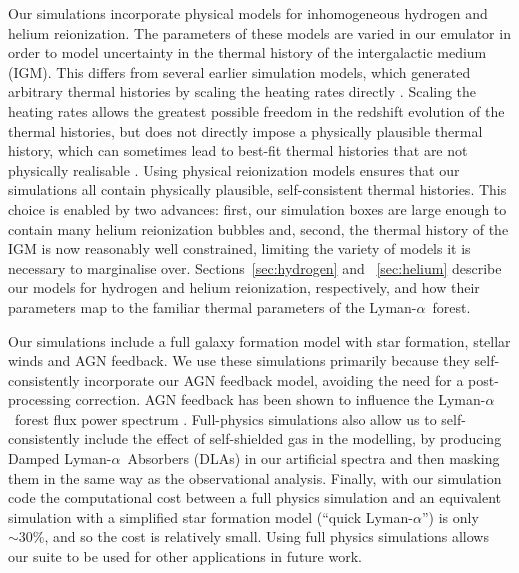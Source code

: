 \documentclass[a4paper,11pt]{article}
\newcommand{\Lya}{Lyman-$\alpha$}
\begin{document}
Our simulations incorporate physical models for inhomogeneous hydrogen and helium reionization. The parameters of these models are varied in our emulator in order to model uncertainty in the thermal history of the intergalactic medium (IGM).
This differs from several earlier simulation models, which generated arbitrary thermal histories by scaling the heating rates directly \cite[e.g.~][]{Viel:2006, Viel:2013wdm, Irsic:2017, Garzilli:2019}. Scaling the heating rates allows the greatest possible freedom in the redshift evolution of the thermal histories, but does not directly impose a physically plausible thermal history, which can sometimes lead to best-fit thermal histories that are not physically realisable \cite{Walther:2019}.
Using physical reionization models ensures that our simulations all contain physically plausible, self-consistent thermal histories. This choice is enabled by two advances: first, our simulation boxes are large enough to contain many helium reionization bubbles and, second, the thermal history of the IGM is now reasonably well constrained, limiting the variety of models it is necessary to marginalise over.
Sections~\ref{sec:hydrogen} and ~\ref{sec:helium} describe our models for hydrogen and helium reionization, respectively, and how their parameters map to the familiar thermal parameters of the \Lya~forest.

Our simulations include a full galaxy formation model with star formation, stellar winds and AGN feedback. We use these simulations primarily because they self-consistently incorporate our AGN feedback model, avoiding the need for a post-processing correction. AGN feedback has been shown to influence the \Lya~forest flux power spectrum \cite{Viel:2013, Chabanier:2020}. Full-physics simulations also allow us to self-consistently include the effect of self-shielded gas in the modelling, by producing Damped \Lya~Absorbers (DLAs) in our artificial spectra and then masking them in the same way as the observational analysis.
Finally, with our simulation code the computational cost between a full physics simulation and an equivalent simulation with a simplified star formation model (``quick \Lya'') is only $\sim 30\%$, and so the cost is relatively small. Using full physics simulations allows our suite to be used for other applications in future work.
\end{document}
